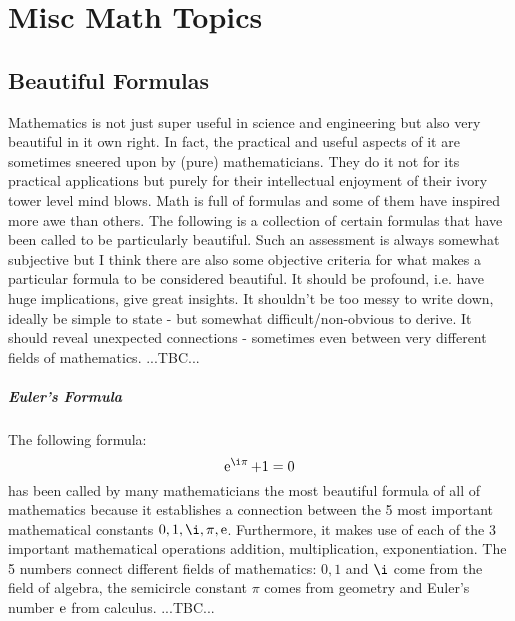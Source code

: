 \chapter{Misc Math Topics}

\section{Beautiful Formulas}
Mathematics is not just super useful in science and engineering but also very beautiful in it own right. In fact, the practical and useful aspects of it are sometimes sneered upon by (pure) mathematicians. They do it not for its practical applications but purely for their intellectual enjoyment of their ivory tower level mind blows. Math is full of formulas and some of them have inspired more awe than others. The following is a collection of certain formulas that have been called to be particularly beautiful. Such an assessment is always somewhat subjective but I think there are also some objective criteria for what makes a particular formula to be considered beautiful. It should be profound, i.e. have huge implications, give great insights. It shouldn't be too messy to write down, ideally be simple to state - but somewhat difficult/non-obvious to derive. It should reveal unexpected connections - sometimes even between very different fields of mathematics. ...TBC...



\paragraph{Euler's Formula}
The following formula:
\begin{equation}
\e^{\i \pi} + 1 = 0
\end{equation}
has been called by many mathematicians the most beautiful formula of all of mathematics because it establishes a connection between the 5 most important mathematical constants $0,1,\i,\pi,\e$. Furthermore, it makes use of each of the 3 important mathematical operations addition, multiplication, exponentiation. The 5 numbers connect different fields of mathematics: $0,1$ and $\i$ come from the field of algebra, the semicircle constant $\pi$ comes from geometry and Euler's number $\operatorname{\mathrm{e}}$ from calculus. ...TBC...

